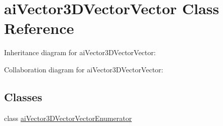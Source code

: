 \hypertarget{classai_vector3_d_vector_vector}{\section{ai\+Vector3\+D\+Vector\+Vector Class Reference}
\label{classai_vector3_d_vector_vector}
}


Inheritance diagram for ai\+Vector3\+D\+Vector\+Vector\+:


Collaboration diagram for ai\+Vector3\+D\+Vector\+Vector\+:
\subsection*{Classes}
\begin{DoxyCompactItemize}
\item 
class \hyperlink{classai_vector3_d_vector_vector_1_1ai_vector3_d_vector_vector_enumerator}{ai\+Vector3\+D\+Vector\+Vector\+Enumerator}
\end{DoxyCompactItemize}
